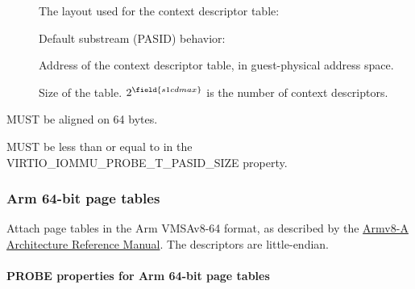 \begin{description}
  \item[] The layout used for the context descriptor
    table:
  \item[] Default substream (PASID) behavior:
  \item[] Address of the context descriptor
    table, in guest-physical address space.
  \item[] Size of the table. $2^\field{s1cdmax}$
    is the number of context descriptors.
\end{description}


 MUST be aligned on 64 bytes.

 MUST be less than or equal to 
in the VIRTIO_IOMMU_PROBE_T_PASID_SIZE property.

\subsubsection{Arm 64-bit page tables}\label{sec:Device Types / IOMMU Device / Table Formats / Arm64}

Attach page tables in the Arm VMSAv8-64 format, as described by
the \hyperref[intro:Armv8-A]{Armv8-A Architecture Reference
Manual}. The descriptors are little-endian.

\paragraph{PROBE properties for Arm 64-bit page tables}\label{sec:Device Types / IOMMU Device / Table Formats / Arm64 / PROBE}

